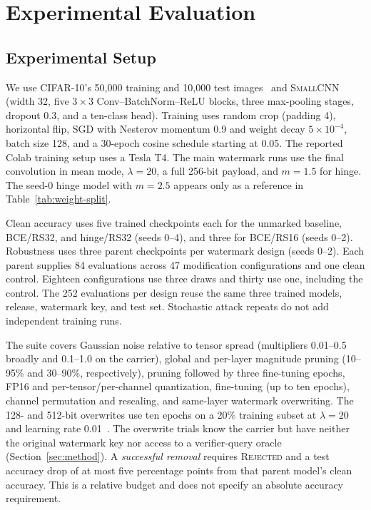 \section{Experimental Evaluation}
\label{sec:evaluation}

\subsection{Experimental Setup}
We use CIFAR-10's 50,000 training and 10,000 test images~\cite{cifar10} and \textsc{SmallCNN} (width 32, five $3\times3$ Conv--BatchNorm--ReLU blocks, three max-pooling stages, dropout 0.3, and a ten-class head). Training uses random crop (padding 4), horizontal flip, SGD with Nesterov momentum 0.9 and weight decay $5\times10^{-4}$, batch size 128, and a 30-epoch cosine schedule starting at 0.05. The reported Colab training setup uses a Tesla T4. The main watermark runs use the final convolution in mean mode, $\lambda=20$, a full 256-bit payload, and $m=1.5$ for hinge. The seed-0 hinge model with $m=2.5$ appears only as a reference in Table~\ref{tab:weight-split}.

Clean accuracy uses five trained checkpoints each for the unmarked baseline, BCE/RS32, and hinge/RS32 (seeds 0--4), and three for BCE/RS16 (seeds 0--2). Robustness uses three parent checkpoints per watermark design (seeds 0--2). Each parent supplies 84 evaluations across 47 modification configurations and one clean control. Eighteen configurations use three draws and thirty use one, including the control. The 252 evaluations per design reuse the same three trained models, release, watermark key, and test set. Stochastic attack repeats do not add independent training runs.

The suite covers Gaussian noise relative to tensor spread (multipliers 0.01--0.5 broadly and 0.1--1.0 on the carrier), global and per-layer magnitude pruning (10--95\% and 30--90\%, respectively), pruning followed by three fine-tuning epochs, FP16 and per-tensor/per-channel quantization, fine-tuning (up to ten epochs), channel permutation and rescaling, and same-layer watermark overwriting. The 128- and 512-bit overwrites use ten epochs on a 20\% training subset at $\lambda=20$ and learning rate 0.01~\cite{projectResults}. The overwrite trials know the carrier but have neither the original watermark key nor access to a verifier-query oracle (Section~\ref{sec:method}). A \emph{successful removal} requires \textsc{Rejected} and a test accuracy drop of at most five percentage points from that parent model's clean accuracy. This is a relative budget and does not specify an absolute accuracy requirement.

